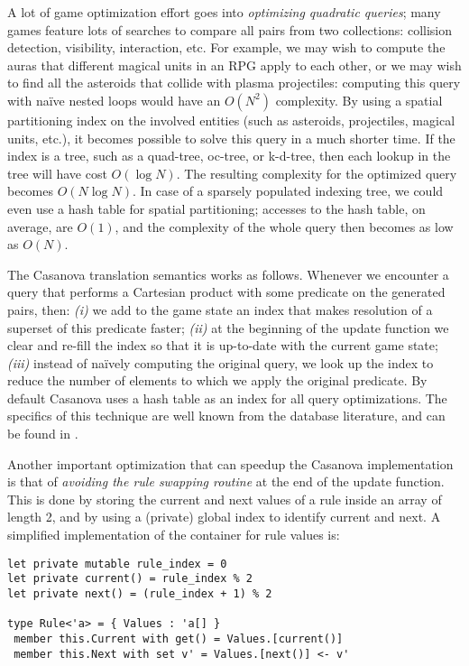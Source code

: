 A lot of game optimization effort goes into \textit{optimizing quadratic queries}; many games feature lots of searches to compare all pairs from two collections: collision detection, visibility, interaction, etc. For example, we may wish to compute the auras that different magical units in an RPG apply to each other, or we may wish to find all the asteroids that collide with plasma projectiles: computing this query with naïve nested loops would have an $O(N^2)$ complexity. By using a spatial partitioning index on the involved entities (such as asteroids, projectiles, magical units, etc.), it becomes possible to solve this query in a much shorter time. If the index is a tree, such as a quad-tree, oc-tree, or k-d-tree, then each lookup in the tree will have cost $O(\log N)$. The resulting complexity for the optimized query becomes $O(N \log N)$. In case of a sparsely populated indexing tree, we could even use a hash table for spatial partitioning; accesses to the hash table, on average, are $O(1)$, and the complexity of the whole query then becomes as low as $O(N)$.

The Casanova translation semantics works as follows. Whenever we encounter a query that performs a Cartesian product with some predicate on the generated pairs, then: \textit{(i)} we add to the game state an index that makes resolution of a superset of this predicate faster; \textit{(ii)} at the beginning of the update function we clear and re-fill the index so that it is up-to-date with the current game state; \textit{(iii)} instead of naïvely computing the original query, we look up the index to reduce the number of elements to which we apply the original predicate. By default Casanova uses a hash table as an index for all query optimizations. The specifics of this technique are well known from the database literature, and can be found in \cite{DATABASE_SYSTEM_IMPLEMENTATION}.

Another important optimization that can speedup the Casanova implementation is that of \textit{avoiding the rule swapping routine} at the end of the update function. This is done by storing the current and next values of a rule inside an array of length 2, and by using a (private) global index to identify current and next. A simplified implementation of the container for rule values is:

\begin{lstlisting}
let private mutable rule_index = 0
let private current() = rule_index % 2
let private next() = (rule_index + 1) % 2

type Rule<'a> = { Values : 'a[] }
 member this.Current with get() = Values.[current()]
 member this.Next with set v' = Values.[next()] <- v'
\end{lstlisting}

